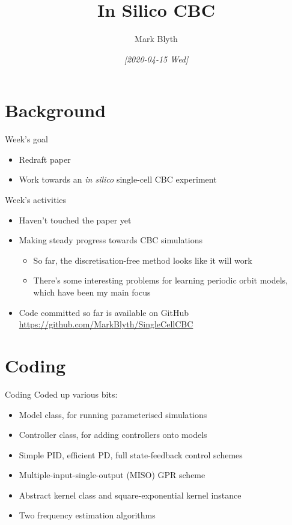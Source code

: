 \documentclass[presentation]{beamer}
\author{Mark Blyth}
\date{\textit{[2020-04-15 Wed]}}
\title{In Silico CBC}
\begin{document}
\maketitle

\section{Background}
\label{sec:orgecfe713}
\begin{frame}[label={sec:orgc3882b7}]{Week's goal}
\begin{itemize}
\item Redraft paper
\item Work towards an \emph{in silico} single-cell CBC experiment
\end{itemize}
\end{frame}

\begin{frame}[label={sec:org7c18716}]{Week's activities}
\begin{itemize}
\item Haven't touched the paper yet
\item Making steady progress towards CBC simulations
\begin{itemize}
\item So far, the discretisation-free method looks like it will work
\item There's some interesting problems for learning periodic orbit models, which have been my main focus
\end{itemize}
\item Code committed so far is available on GitHub \url{https://github.com/MarkBlyth/SingleCellCBC}
\end{itemize}
\end{frame}

\section{Coding}
\label{sec:org08f7944}
\begin{frame}[label={sec:org0772d65}]{Coding}
Coded up various bits:
\begin{itemize}
\item Model class, for running parameterised simulations
\item Controller class, for adding controllers onto models
\item Simple PID, efficient PD, full state-feedback control schemes
\item Multiple-input-single-output (MISO) GPR scheme
\item Abstract kernel class and square-exponential kernel instance
\item Two frequency estimation algorithms
\end{itemize}
\end{frame}
\end{document}
